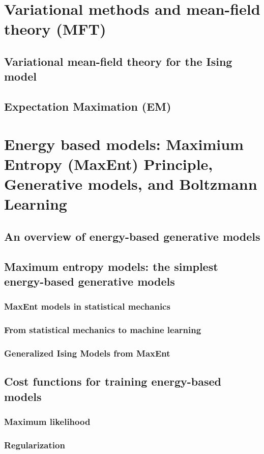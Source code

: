 \documentclass[norsk,a4paper,11pt]{article}
\begin{document}
\section{Variational methods and mean-field theory (MFT)}
\subsection{Variational mean-field theory for the Ising model}
\subsection{Expectation Maximation (EM)}




\section{Energy based models: Maximium Entropy (MaxEnt) Principle, Generative models, and Boltzmann Learning}
\subsection{An overview of energy-based generative models}
\subsection{Maximum entropy models: the simplest energy-based generative models}
\subsubsection{MaxEnt models in statistical mechanics}
\subsubsection{From statistical mechanics to machine learning}
\subsubsection{Generalized Ising Models from MaxEnt}

\subsection{Cost functions for training energy-based models}
\subsubsection{Maximum likelihood}
\subsubsection{Regularization}
\end{document}

